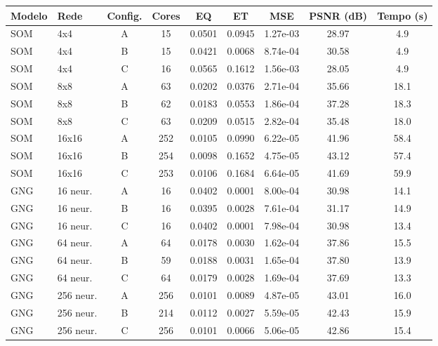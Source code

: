 \begin{tabular}{llccccccc}
\toprule
Modelo & Rede & Config. & Cores & EQ & ET & MSE & PSNR (dB) & Tempo (s)\\
\midrule
SOM & 4x4 & A & 15 & 0.0501 & 0.0945 & 1.27e-03 & 28.97 & 4.9\\
SOM & 4x4 & B & 15 & 0.0421 & 0.0068 & 8.74e-04 & 30.58 & 4.9\\
SOM & 4x4 & C & 16 & 0.0565 & 0.1612 & 1.56e-03 & 28.05 & 4.9\\
\midrule
SOM & 8x8 & A & 63 & 0.0202 & 0.0376 & 2.71e-04 & 35.66 & 18.1\\
SOM & 8x8 & B & 62 & 0.0183 & 0.0553 & 1.86e-04 & 37.28 & 18.3\\
SOM & 8x8 & C & 63 & 0.0209 & 0.0515 & 2.82e-04 & 35.48 & 18.0\\
\midrule
SOM & 16x16 & A & 252 & 0.0105 & 0.0990 & 6.22e-05 & 41.96 & 58.4\\
SOM & 16x16 & B & 254 & 0.0098 & 0.1652 & 4.75e-05 & 43.12 & 57.4\\
SOM & 16x16 & C & 253 & 0.0106 & 0.1684 & 6.64e-05 & 41.69 & 59.9\\
\midrule
GNG & 16 neur. & A & 16 & 0.0402 & 0.0001 & 8.00e-04 & 30.98 & 14.1\\
GNG & 16 neur. & B & 16 & 0.0395 & 0.0028 & 7.61e-04 & 31.17 & 14.9\\
GNG & 16 neur. & C & 16 & 0.0402 & 0.0001 & 7.98e-04 & 30.98 & 13.4\\
\midrule
GNG & 64 neur. & A & 64 & 0.0178 & 0.0030 & 1.62e-04 & 37.86 & 15.5\\
GNG & 64 neur. & B & 59 & 0.0188 & 0.0031 & 1.65e-04 & 37.80 & 13.9\\
GNG & 64 neur. & C & 64 & 0.0179 & 0.0028 & 1.69e-04 & 37.69 & 13.3\\
\midrule
GNG & 256 neur. & A & 256 & 0.0101 & 0.0089 & 4.87e-05 & 43.01 & 16.0\\
GNG & 256 neur. & B & 214 & 0.0112 & 0.0027 & 5.59e-05 & 42.43 & 15.9\\
GNG & 256 neur. & C & 256 & 0.0101 & 0.0066 & 5.06e-05 & 42.86 & 15.4\\
\bottomrule
\end{tabular}

